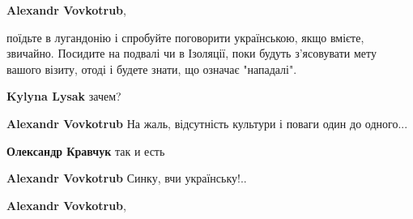 \begin{itemize}
\begin{itemize}
 
\textbf{Alexandr Vovkotrub}, 

поїдьте в лугандонію і спробуйте поговорити українською, якщо вмієте, звичайно.
Посидите на подвалі чи в Ізоляції, поки будуть з'ясовувати мету вашого візиту,
отоді і будете знати, що означає "нападалі".


 
\textbf{Kylyna Lysak} зачем?

 
\textbf{Alexandr Vovkotrub} На жаль, відсутність культури і поваги один до одного...

 
\textbf{Олександр Кравчук} так и есть

 
\textbf{Alexandr Vovkotrub} Синку, вчи українську!..

 
\textbf{Alexandr Vovkotrub}, 


\end{itemize}
\end{itemize}
